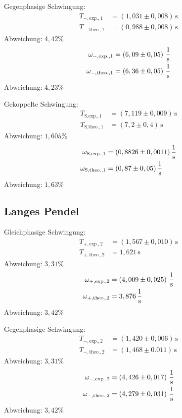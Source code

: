Gegenphasige Schwingung:\\
\begin{align*}
    T_{-,\text{exp.}, 1} &= \left(1,031 \pm 0,008 \right)\, \unit{\second}\\
    T_{-,\text{theo.},1} &= \left( 0,988 \pm 0,008 \right)\, \unit{\second}
\end{align*}
Abweichung: $4,42\%$
\begin{align*}
    \omega_{-,\text{exp.},1} &= \left( 6,09 \pm 0,05 \right)\, \unit[per-mode=fraction]{\per \second}\\
    \omega_{-,\text{theo.},1} &= \left( 6,36 \pm 0,05 \right)\,\unit[per-mode=fraction]{\per \second}
\end{align*}
Abweichung: $4,23\%$

Gekoppelte Schwingung:\\
\begin{align*}
    T_{\text{S,exp.},1} &= \left( 7,119 \pm 0,009 \right)\, \unit{\second}\\
    T_{\text{S,theo.},1} &= \left( 7,2 \pm 0,4 \right)\, \unit{\second}
\end{align*}
Abweichung: $1,60å\%$
\begin{align*}
    \omega_{\text{S,exp.},1} &= \left( 0,8826 \pm 0,0011 \right)\unit[per-mode=fraction]{\per \second}\\
    \omega_{\text{S,theo.},1} &= \left( 0,87 \pm 0,05 \right)\unit[per-mode=fraction]{\per \second}
\end{align*}
Abweichung: $1,63\%$
%
%
\subsection{Langes Pendel}
Gleichphasige Schwingung:\\
\begin{align*}
    T_{+,\text{exp.},2} &= \left( 1,567 \pm 0,010 \right)\, \unit{\second}\\
    T_{+,\text{theo.},2} &= 1,621\, \unit{\second}
\end{align*}
Abweichung: $3,31\%$
\begin{align*}
    \omega_{+,\text{exp.},2} &= \left( 4,009 \pm 0,025 \right)\, \unit[per-mode=fraction]{\per\second}\\
    \omega_{+,\text{theo.},2} &= 3,876 \, \unit[per-mode=fraction]{\per\second}
\end{align*}
Abweichung: $3,42\%$

Gegenphasige Schwingung:\\
\begin{align*}
    T_{-,\text{exp.},2} &= \left(1,420 \pm 0,006\right)\,\unit{\second}\\
    T_{-,\text{theo.},2} &= \left( 1,468 \pm 0.011 \right)\,\unit{\second}
\end{align*}
Abweichung: $3,31\%$
\begin{align*}
    \omega_{-,\text{exp.},2} &= \left(4,426 \pm 0,017 \right)\, \unit[per-mode=fraction]{\per\second}\\
    \omega_{-,\text{theo.},2} &= \left( 4,279 \pm 0,031 \right)\, \unit[per-mode=fraction]{\per\second}
\end{align*}
Abweichung: $3,42\%$

